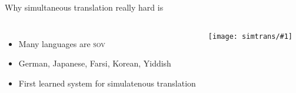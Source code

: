 \documentclass[compress]{beamer}
\newcommand{\gfxs}[2]{
\begin{center}
	\texttt{[image: simtrans/\#1]}
\end{center}
}
\begin{document}
\begin{frame}{Why simultaneous translation really hard is}

  \begin{columns}
      \begin{itemize}
        \item Many languages are \textsc{sov}
        \item \alert<2>{German}, Japanese, Farsi, Korean,
          \alert<3>{Yiddish}
        \item<4-> First learned system for simulatenous translation
      \end{itemize}
      \gfxs{yoda}{.6}
  \end{columns}

  \centering


\end{frame}
\end{document}
